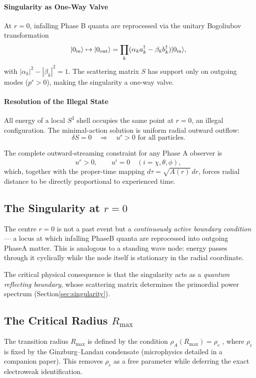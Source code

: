 \documentclass[10pt,twocolumn]{article}
\theoremstyle{definition}
\newcommand{\Rmax}{R_{\max}}
\newcommand{\rhoA}{\rho_{A}}
\newcommand{\rhoc}{\rho_{c}}
\begin{document}
\paragraph{Singularity as One-Way Valve}  
At \( r=0 \), infalling Phase B quanta are reprocessed via the unitary Bogoliubov transformation
\[
|0_{\rm in}\rangle \mapsto |0_{\rm out}\rangle = \prod_k (\alpha_k a_k^\dagger - \beta_k b_k^\dagger) |0_{\rm in}\rangle,
\]
with \( |\alpha_k|^2 - |\beta_k|^2 = 1 \). The scattering matrix \( S \) has support only on outgoing modes (\( p^r > 0 \)), making the singularity a one-way valve.

\paragraph{Resolution of the Illegal State}  
All energy of a local \( S^3 \) shell occupies the same point at \( r=0 \), an illegal configuration. The minimal-action solution is uniform radial outward outflow:
\[
\delta S = 0 \quad \Rightarrow \quad u^r > 0 \text{ for all particles}.
\]

The complete outward-streaming constraint for any Phase A observer is
\[
u^r > 0, \qquad u^i = 0 \quad (i = \chi,\theta,\phi),
\]
which, together with the proper-time mapping \( d\tau = \sqrt{A(r)}\,dr \), forces radial distance to be directly proportional to experienced time.



\subsection{The Singularity at \( r=0 \)}
\label{sec:singularity-topology}

The centre \( r=0 \) is not a past event but a
\emph{continuously active boundary condition} --- a locus
at which infalling Phase\nobreakspace{}B quanta are reprocessed into
outgoing Phase\nobreakspace{}A matter.  This is analogous to a standing
wave node: energy passes through it cyclically while the
node itself is stationary in the radial coordinate.

The critical physical consequence is that the singularity
acts as a \emph{quantum reflecting boundary}, whose
scattering matrix determines the primordial power spectrum
(Section\nobreakspace{}\ref{sec:singularity}).

\subsection{The Critical Radius \(\Rmax\)}
\label{sec:rmax}
The transition radius \(\Rmax\) is defined by the condition \(\rhoA(\Rmax)=\rhoc\) \(\label{eq:Rmax-derived}\),
where \(\rhoc\) is fixed by the Ginzburg--Landau condensate (microphysics detailed in a companion paper).
This removes \(\rhoc\) as a free parameter while deferring the exact electroweak identification.
\end{document}
